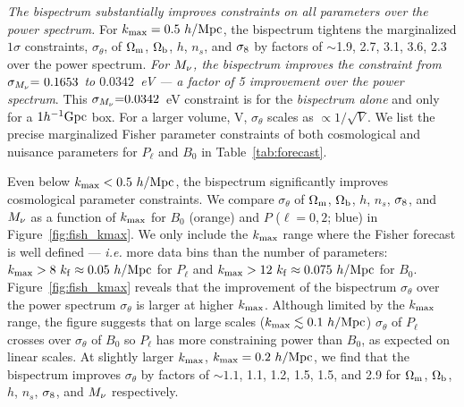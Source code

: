 {\em The bispectrum substantially improves constraints on all parameters 
over the power spectrum.} For $k_{\rm max} = 0.5~h/{\rm Mpc}$, the 
bispectrum tightens the marginalized $1\sigma$ constraints, $\sigma_\theta$, of $\Omega_{\rm m}$, 
$\Omega_{\rm b}$, $h$, $n_s$, and $\sigma_8$ by factors of $\sim$1.9, 2.7, 3.1, 3.6, 2.3 over 
the power spectrum. {\em For $M_\nu$, the bispectrum improves the constraint 
from $\sigma_{M_\nu}{=}~0.1653$ to $0.0342$~eV --- a factor of 5 improvement 
over the power spectrum}. This $\sigma_{M_\nu}{=}0.0342$~eV constraint is for 
the {\em bispectrum alone} and only for a $1h^{-1}{\rm Gpc}$ box. For a larger 
volume, V, $\sigma_\theta$ scales as $\propto1/\sqrt{V}$. We list the precise
marginalized Fisher parameter constraints of both cosmological and nuisance 
parameters for $P_\ell$ and $B_0$ in Table~\ref{tab:forecast}. 

Even below $k_{\rm max} < 0.5~h/{\rm Mpc}$, the bispectrum significantly 
improves cosmological parameter constraints. We compare $\sigma_\theta$ 
of $\Omega_{\rm m}$, $\Omega_{\rm b}$, $h$, $n_s$, $\sigma_8$, and $M_\nu$ as a function of $k_{\rm max}$ 
for $B_0$ (orange) and $P$ ($\ell=0,2$; blue) in Figure~\ref{fig:fish_kmax}. We only 
include the $k_{\rm max}$ range where the Fisher forecast is well defined --- 
\emph{i.e.} more data bins than the number of parameters: $k_{\rm max} > 8~k_{\rm f} \approx 0.05~h/{\rm Mpc}$ 
for $P_\ell$ and $k_{\rm max} > 12~k_{\rm f} \approx 0.075~h/{\rm Mpc}$ for 
$B_0$. Figure~\ref{fig:fish_kmax} reveals that the improvement of the
bispectrum $\sigma_\theta$ over the power spectrum $\sigma_\theta$ is 
larger at higher $k_{\rm max}$. Although limited by the $k_{\rm max}$ range, 
the figure suggests that on large scales ($k_{\rm max}\lesssim 0.1~h/{\rm Mpc}$) 
$\sigma_\theta$ of $P_\ell$ crosses over $\sigma_\theta$ of $B_0$ so $P_\ell$ has more 
constraining power than $B_0$, as expected on linear scales. At slightly 
larger $k_{\rm max}$, $k_{\rm max} = 0.2~h/{\rm Mpc}$, we find that 
the bispectrum improves $\sigma_\theta$ by factors of 
$\sim 1.1$, 1.1, 1.2, 1.5, 1.5, and 2.9 for $\Omega_{\rm m}$, $\Omega_{\rm b}$, $h$, $n_s$, $\sigma_8$, 
and $M_\nu$ respectively. 

